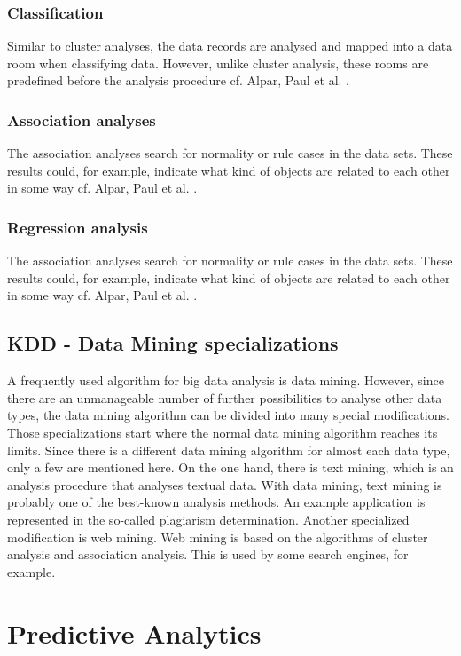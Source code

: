 \documentclass[12pt,twocolumn,twoside]{conference}   %
\begin{document}
\subsubsection{Classification}
Similar to cluster analyses, the data records are analysed and mapped into a data room when classifying data. However, unlike cluster analysis, these rooms are predefined before the analysis procedure {cf. Alpar, Paul et al. \cite{14}}.  

\subsubsection{Association analyses}
The association analyses search for normality or rule cases in the data sets. These results could, for example, indicate what kind of objects are related to each other in some way {cf. Alpar, Paul et al. \cite{14}}.

\subsubsection{Regression analysis}
The association analyses search for normality or rule cases in the data sets. These results could, for example, indicate what kind of objects are related to each other in some way {cf. Alpar, Paul et al. \cite{14}}.

\subsection{KDD - Data Mining specializations}
A frequently used algorithm for big data analysis is data mining. However, since there are an unmanageable number of further possibilities to analyse other data types, the data mining algorithm can be divided into many special modifications. Those specializations start where the normal data mining algorithm reaches its limits. Since there is a different data mining algorithm for almost each  data type, only a few are mentioned here. On the one hand, there is text mining, which is an analysis procedure that analyses textual data. With data mining, text mining is probably one of the best-known analysis methods. An example application is represented in the so-called plagiarism determination. Another specialized modification is web mining. Web mining is based on the algorithms of cluster analysis and association analysis. This is used by some search engines, for example. 


\section{Predictive Analytics}
\end{document}
